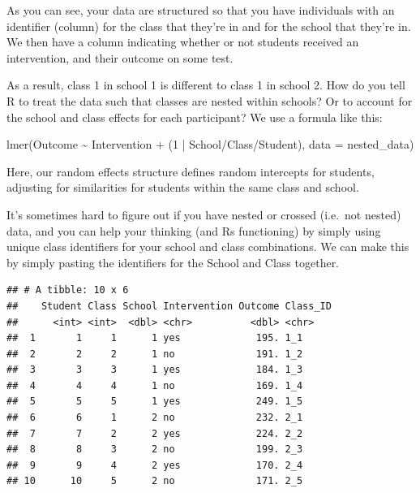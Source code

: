 \documentclass[
]{book}
\newenvironment{Shaded}{\begin{snugshade}}{\end{snugshade}}
\newcommand{\AttributeTok}[1]{\textcolor[rgb]{0.77,0.63,0.00}{#1}}
\newcommand{\DecValTok}[1]{\textcolor[rgb]{0.00,0.00,0.81}{#1}}
\newcommand{\FunctionTok}[1]{\textcolor[rgb]{0.00,0.00,0.00}{#1}}
\newcommand{\NormalTok}[1]{#1}
\newcommand{\OtherTok}[1]{\textcolor[rgb]{0.56,0.35,0.01}{#1}}
\newcommand{\SpecialCharTok}[1]{\textcolor[rgb]{0.00,0.00,0.00}{#1}}
\newcommand{\StringTok}[1]{\textcolor[rgb]{0.31,0.60,0.02}{#1}}
\begin{document}
As you can see, your data are structured so that you have individuals with an identifier (column) for the class that they're in and for the school that they're in. We then have a column indicating whether or not students received an intervention, and their outcome on some test.

As a result, class 1 in school 1 is different to class 1 in school 2. How do you tell R to treat the data such that classes are nested within schools? Or to account for the school and class effects for each participant? We use a formula like this:

\begin{Shaded}
\begin{Highlighting}[]
\FunctionTok{lmer}\NormalTok{(Outcome }\SpecialCharTok{\textasciitilde{}}\NormalTok{ Intervention }\SpecialCharTok{+}\NormalTok{ (}\DecValTok{1} \SpecialCharTok{|}\NormalTok{ School}\SpecialCharTok{/}\NormalTok{Class}\SpecialCharTok{/}\NormalTok{Student), }\AttributeTok{data =}\NormalTok{ nested\_data)}
\end{Highlighting}
\end{Shaded}

Here, our random effects structure defines random intercepts for students, adjusting for similarities for students within the same class and school.

It's sometimes hard to figure out if you have nested or crossed (i.e.~not nested) data, and you can help your thinking (and Rs functioning) by simply using unique class identifiers for your school and class combinations. We can make this by simply pasting the identifiers for the School and Class together.

\begin{Shaded}
\end{Shaded}

\begin{verbatim}
## # A tibble: 10 x 6
##    Student Class School Intervention Outcome Class_ID
##      <int> <int>  <dbl> <chr>          <dbl> <chr>   
##  1       1     1      1 yes             195. 1_1     
##  2       2     2      1 no              191. 1_2     
##  3       3     3      1 yes             184. 1_3     
##  4       4     4      1 no              169. 1_4     
##  5       5     5      1 yes             249. 1_5     
##  6       6     1      2 no              232. 2_1     
##  7       7     2      2 yes             224. 2_2     
##  8       8     3      2 no              199. 2_3     
##  9       9     4      2 yes             170. 2_4     
## 10      10     5      2 no              171. 2_5
\end{verbatim}
\end{document}
